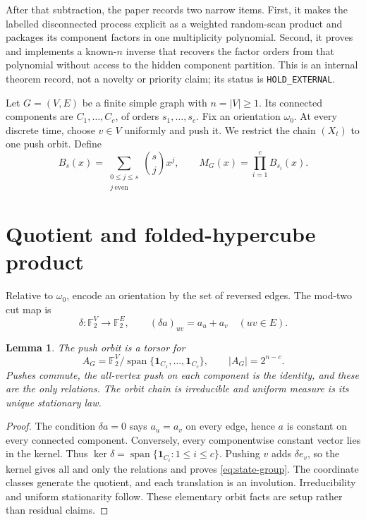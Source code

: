 \documentclass[10pt,a4paper]{amsart}
\newtheorem{lemma}[theorem]{Lemma}
\theoremstyle{remark}
\newcommand{\F}{\mathbb F}
\newcommand{\one}{\mathbf 1}
\newcommand{\Span}{\operatorname{span}}
\begin{document}
After that subtraction, the paper records two narrow items.  First, it makes
the labelled disconnected process explicit as a weighted random-scan product
and packages its component factors in one multiplicity polynomial.  Second,
it proves and implements a known-$n$ inverse that recovers the factor orders
from that polynomial without access to the hidden component partition.  This
is an internal theorem record, not a novelty or priority claim; its status is
\texttt{HOLD\_EXTERNAL}.

Let $G=(V,E)$ be a finite simple graph with $n=|V|\geq1$.  Its connected
components are $C_1,\ldots,C_c$, of orders $s_1,\ldots,s_c$.  Fix an
orientation $\omega_0$.  At every discrete time, choose $v\in V$ uniformly
and push it.  We restrict the chain $(X_t)$ to one push orbit.  Define
\begin{equation}\label{eq:factors}
 B_s(x)=\sum_{\substack{0\leq j\leq s\\j\ \mathrm{even}}}
          \binom{s}{j}x^j,
 \qquad
 M_G(x)=\prod_{i=1}^c B_{s_i}(x).
\end{equation}

\section{Quotient and folded-hypercube product}\label{sec:quotient}

Relative to $\omega_0$, encode an orientation by the set of reversed edges.
The mod-two cut map is
\begin{equation}\label{eq:cut}
 \delta:\F_2^V\longrightarrow\F_2^E,
 \qquad (\delta a)_{uv}=a_u+a_v
 \quad(uv\in E).
\end{equation}

\begin{lemma}\label{lem:kernel}
The push orbit is a torsor for
\begin{equation}\label{eq:state-group}
 A_G=\F_2^V/
 \Span\{\one_{C_1},\ldots,\one_{C_c}\},
 \qquad |A_G|=2^{n-c}.
\end{equation}
Pushes commute, the all-vertex push on each component is the identity, and
these are the only relations.  The orbit chain is irreducible and uniform
measure is its unique stationary law.
\end{lemma}

\begin{proof}
The condition $\delta a=0$ says $a_u=a_v$ on every edge, hence $a$ is
constant on every connected component.  Conversely, every componentwise
constant vector lies in the kernel.  Thus
$\ker\delta=\Span\{\one_{C_i}:1\leq i\leq c\}$.  Pushing $v$ adds
$\delta e_v$, so the kernel gives all and only the relations and proves
\eqref{eq:state-group}.  The coordinate classes generate the quotient, and
each translation is an involution.  Irreducibility and uniform stationarity
follow.  These elementary orbit facts are setup rather than residual claims.
\end{proof}
\end{document}

